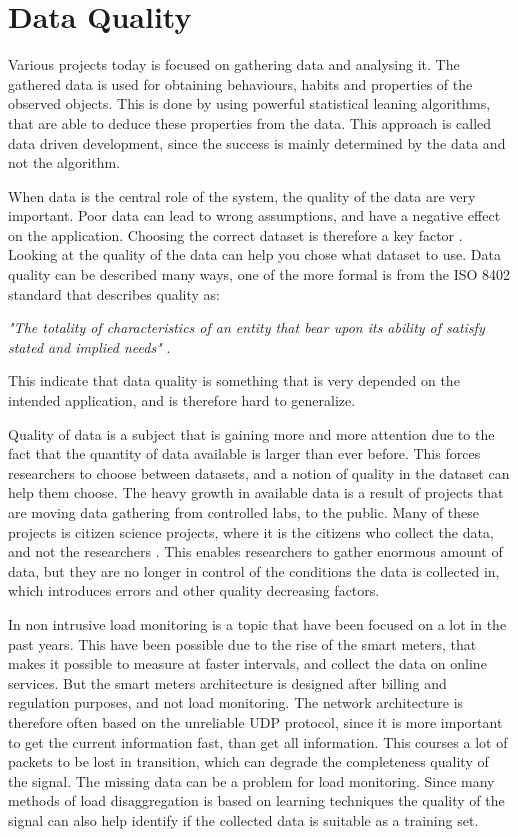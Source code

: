 \chapter{Data Quality}
\label{Sec:DataQuality}
Various projects today is focused on gathering data and analysing it. The gathered data is used for obtaining behaviours, habits and properties of the observed objects. This is done by using powerful statistical leaning algorithms, that are able to deduce these properties from the data. This approach is called data driven development, since the success is mainly determined by the data and not the algorithm. 

When data is the central role of the system, the quality of the data are very important. Poor data can lead to wrong assumptions, and have a negative effect on the application. Choosing the correct dataset is therefore a key factor \cite{RefWorks:3}. Looking at the quality of the data can help you chose what dataset to use. Data quality can be described many ways, one of the more formal is from the ISO 8402 standard that describes quality as: 

\begin{adjustwidth}{2.5em}{2.5em}
\emph{"The totality of characteristics of an entity that bear upon its ability of satisfy stated and implied needs"} \cite{RefWorks:5}.
\end{adjustwidth}

This indicate that data quality is something that is very depended on the intended application, and is therefore hard to generalize. 

Quality of data is a subject that is gaining more and more attention due to the fact that the quantity of data available is larger than ever before. This forces researchers to choose between datasets, and a notion of quality in the dataset can help them choose. The heavy growth in available data is a result of projects that are moving data gathering from controlled labs, to the public. Many of these projects is citizen science projects, where it is the citizens who collect the data, and not the researchers \cite{RefWorks:2}. This enables researchers to gather enormous amount of data, but they are no longer in control of the conditions the data is collected in, which introduces errors and other quality decreasing factors. 

In non intrusive load monitoring is a topic that have been focused on a lot in the past years. This have been possible due to the rise of the smart meters, that makes it possible to measure at faster intervals, and collect the data on online services. But the smart meters architecture is designed after billing and regulation purposes, and not load monitoring. The network architecture is therefore often based on the unreliable UDP protocol, since it is more important to get the current information fast, than get all information. This courses a lot of packets to be lost in transition, which can degrade the completeness quality of the signal. The missing data can be a problem for load monitoring. Since many methods of load disaggregation is based on learning techniques the quality of the signal can also help identify if the collected data is suitable as a training set. 


